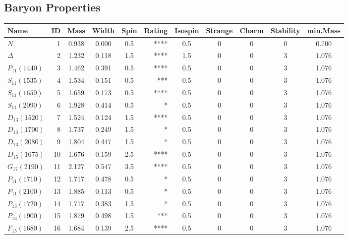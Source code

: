 \documentclass[a4paper,10pt]{article}
\begin{document}
\subsection{Baryon Properties}
\begin{tabular}{lrcccrccccc} 
\toprule
\textbf{Name}&\textbf{ID}&\textbf{Mass}&\textbf{Width}&\textbf{Spin}&\textbf{Rating}&
\textbf{Isospin}&\textbf{Strange}&\textbf{Charm}&\textbf{Stability}&\textbf{min.Mass} \\
\midrule
$N             $ &   1&  0.938&  0.000 &  0.5 &  ****&      0.5&       0&       0&       0& 0.700\\
$\Delta        $ &   2&  1.232&  0.118 &  1.5 &  ****&      1.5&       0&       0&       3& 1.076\\
$P_{11}(1440)  $ &   3&  1.462&  0.391 &  0.5 &  ****&      0.5&       0&       0&       3& 1.076\\
$S_{11}(1535)  $ &   4&  1.534&  0.151 &  0.5 &   ***&      0.5&       0&       0&       3& 1.076\\
$S_{11}(1650)  $ &   5&  1.659&  0.173 &  0.5 &  ****&      0.5&       0&       0&       3& 1.076\\
$S_{11}(2090)  $ &   6&  1.928&  0.414 &  0.5 &     *&      0.5&       0&       0&       3& 1.076\\
$D_{13}(1520)  $ &   7&  1.524&  0.124 &  1.5 &  ****&      0.5&       0&       0&       3& 1.076\\
$D_{13}(1700)  $ &   8&  1.737&  0.249 &  1.5 &     *&      0.5&       0&       0&       3& 1.076\\
$D_{13}(2080)  $ &   9&  1.804&  0.447 &  1.5 &     *&      0.5&       0&       0&       3& 1.076\\
$D_{15}(1675)  $ &  10&  1.676&  0.159 &  2.5 &  ****&      0.5&       0&       0&       3& 1.076\\
$G_{17}(2190)  $ &  11&  2.127&  0.547 &  3.5 &  ****&      0.5&       0&       0&       3& 1.076\\
$P_{11}(1710)  $ &  12&  1.717&  0.478 &  0.5 &     *&      0.5&       0&       0&       3& 1.076\\
$P_{11}(2100)  $ &  13&  1.885&  0.113 &  0.5 &     *&      0.5&       0&       0&       3& 1.076\\
$P_{13}(1720)  $ &  14&  1.717&  0.383 &  1.5 &     *&      0.5&       0&       0&       3& 1.076\\
$P_{13}(1900)  $ &  15&  1.879&  0.498 &  1.5 &   ***&      0.5&       0&       0&       3& 1.076\\
$F_{15}(1680)  $ &  16&  1.684&  0.139 &  2.5 &  ****&      0.5&       0&       0&       3& 1.076\\

\end{tabular}
\end{document}
